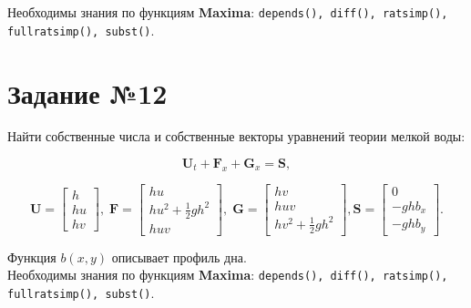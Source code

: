 	Необходимы знания по функциям \textbf{Maxima}: {\tt depends(), diff(), ratsimp(), fullratsimp(), subst()}.

\section*{Задание №12}

	Найти собственные числа и собственные векторы уравнений теории мелкой воды:
	
	\begin{equation}
		\mathbf{U}_{t} + \mathbf{F}_{x} + \mathbf{G}_{x} = \mathbf{S},
	\end{equation}

	\begin{equation}
		\mathbf{U} =
		\begin{bmatrix}
			h \\
			h u \\
			h v
		\end{bmatrix}, \;
		\mathbf{F} =
		\begin{bmatrix}
			h u \\
			h u^{2} + \frac{1}{2} g h^{2} \\
			h u v
		\end{bmatrix}, \;
		\mathbf{G} =
		\begin{bmatrix}
			h v \\
			h u v \\
			h v^{2} + \frac{1}{2} g h^{2}
		\end{bmatrix},
		\mathbf{S} =
		\begin{bmatrix}
			0 \\
			-g h b_{x} \\
			-g h b_{y}
		\end{bmatrix}.
	\end{equation}

	Функция $b \left( x, y \right)$ описывает профиль дна.\\

	Необходимы знания по функциям \textbf{Maxima}: {\tt depends(), diff(), ratsimp(), fullratsimp(), subst()}.

    \newpage